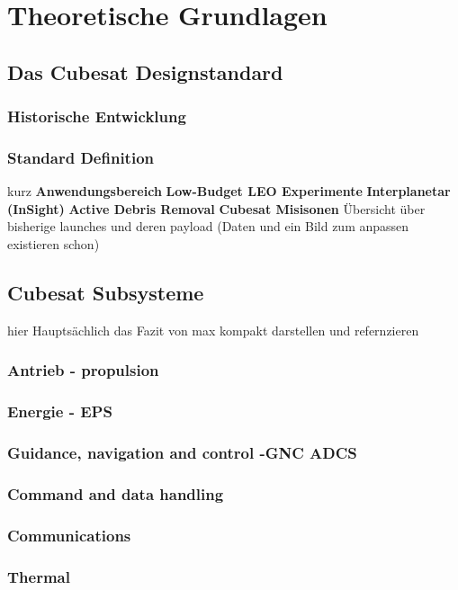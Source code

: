 \chapter{Theoretische Grundlagen}
\section{Das Cubesat Designstandard}
	\subsection{Historische Entwicklung}
	\subsection{Standard Definition} kurz
					\textbf{Anwendungsbereich}
					\textbf{Low-Budget LEO Experimente}
					\textbf{Interplanetar (InSight)}
					\textbf{Active Debris Removal}
					\textbf{Cubesat Misisonen}
					Übersicht über bisherige launches und deren payload (Daten und ein Bild zum anpassen existieren schon)
			
	\section{Cubesat Subsysteme}
	hier Hauptsächlich das Fazit von max kompakt darstellen und refernzieren
		\subsection{Antrieb - propulsion}
		\subsection{Energie - EPS}
		\subsection{Guidance, navigation and control -GNC ADCS}
		\subsection{Command and data handling}
		\subsection{Communications}
		\subsection{Thermal}
